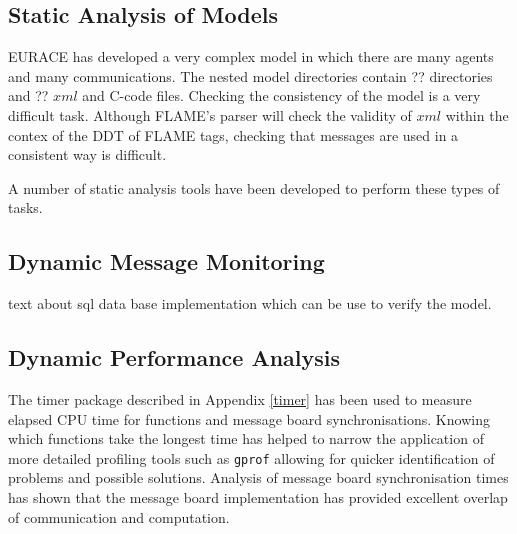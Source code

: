 \subsection{Static Analysis of Models}

EURACE has developed a very complex model in which there are many agents and many communications. The nested model directories contain ?? directories and ?? $xml$ and C-code files. Checking the consistency of the model is a very difficult task. Although FLAME's parser will check the validity of $xml$ within the contex of the DDT of FLAME tags, checking that messages are used in a consistent way is difficult.

A number of static analysis tools have been developed to perform these types of tasks.

\subsection{Dynamic Message Monitoring}

text about sql data base implementation which can be use to verify the model.

\subsection{Dynamic Performance Analysis}

The timer package described in Appendix \ref{timer} has been used to measure elapsed CPU time for functions and message board synchronisations. Knowing which functions take the longest time has helped to narrow the application of more detailed profiling tools such as \texttt{gprof} allowing for quicker identification of problems and possible solutions. Analysis of message board synchronisation times has shown that the message board implementation has provided excellent overlap of communication and computation.
